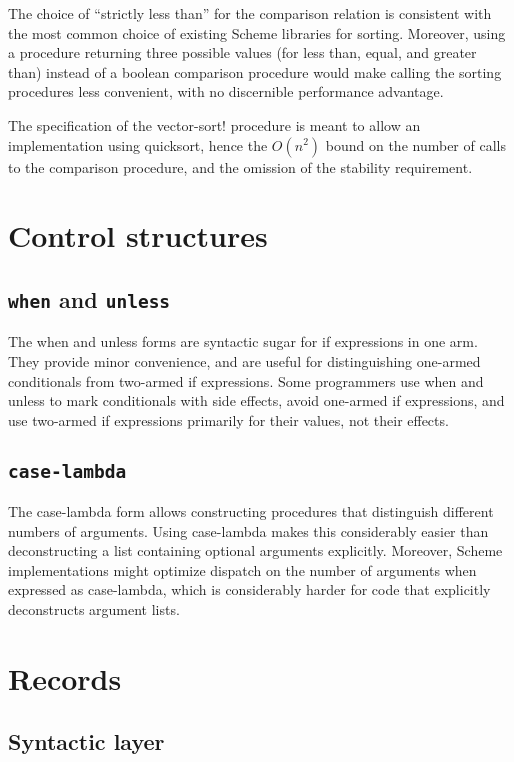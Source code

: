 \documentclass[twoside,twocolumn]{algol60}
\begin{document}
The choice of ``strictly less than'' for the comparison relation is
consistent with the most common choice of existing Scheme libraries
for sorting.  Moreover, using a procedure returning three possible
values (for less than, equal, and greater than) instead of a boolean
comparison procedure would make calling the sorting procedures less
convenient, with no discernible performance advantage.

The specification of the {\cf vector-sort!} procedure is meant to
allow an implementation using quicksort, hence the $O(n^2)$
bound on the number of calls to the comparison procedure, and the
omission of the stability requirement.

\chapter{Control structures}

\section{{\tt when} and {\tt unless}}

The {\cf when} and {\cf unless} forms are syntactic sugar for {\cf if}
expressions in one arm.  They provide minor convenience, and are
useful for distinguishing one-armed conditionals from two-armed {\cf
  if} expressions.  Some programmers use {\cf when} and {\cf unless}
to mark conditionals with side effects, avoid one-armed {\cf if}
expressions, and use two-armed {\cf if} expressions primarily for
their values, not their effects.

\section{{\tt case-lambda}}

The {\cf case-lambda} form allows constructing procedures that
distinguish different numbers of arguments.  Using {\cf case-lambda}
makes this considerably easier than deconstructing a list containing
optional arguments explicitly.  Moreover, Scheme implementations might
optimize dispatch on the number of arguments when expressed as {\cf
  case-lambda}, which is considerably harder for code that explicitly
deconstructs argument lists.

\chapter{Records}


\section{Syntactic layer}
\end{document}
